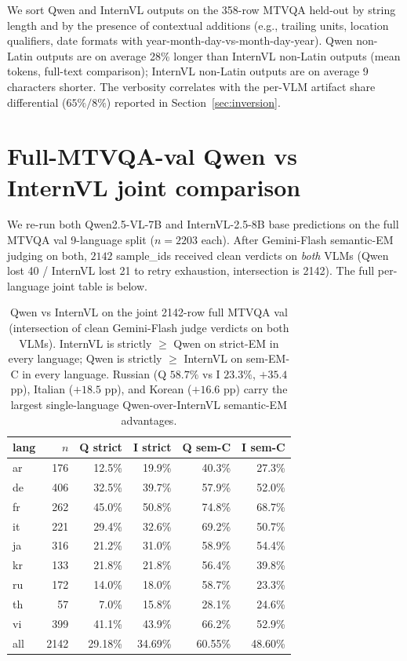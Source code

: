 We sort Qwen and InternVL outputs on the 358-row MTVQA held-out by string length and by the presence of contextual additions (e.g., trailing units, location qualifiers, date formats with year-month-day-vs-month-day-year). Qwen non-Latin outputs are on average 28\% longer than InternVL non-Latin outputs (mean tokens, full-text comparison); InternVL non-Latin outputs are on average 9 characters shorter. The verbosity correlates with the per-VLM artifact share differential ($65\% / 8\%$) reported in Section~\ref{sec:inversion}.

\section{Full-MTVQA-val Qwen vs InternVL joint comparison}
\label{app:per-language-fullval-joint}

We re-run both Qwen2.5-VL-7B and InternVL-2.5-8B base predictions on the full MTVQA val 9-language split ($n=2203$ each). After Gemini-Flash semantic-EM judging on both, $2142$ sample\_ids received clean verdicts on \emph{both} VLMs (Qwen lost 40 / InternVL lost 21 to retry exhaustion, intersection is 2142). The full per-language joint table is below.

\begin{table}[t]
\centering
\small
\begin{tabular}{lrrrrr}
\toprule
lang & $n$ & Q strict & I strict & Q sem-C & I sem-C \\
\midrule
ar & 176 & 12.5\% & 19.9\% & 40.3\% & 27.3\% \\
de & 406 & 32.5\% & 39.7\% & 57.9\% & 52.0\% \\
fr & 262 & 45.0\% & 50.8\% & 74.8\% & 68.7\% \\
it & 221 & 29.4\% & 32.6\% & 69.2\% & 50.7\% \\
ja & 316 & 21.2\% & 31.0\% & 58.9\% & 54.4\% \\
kr & 133 & 21.8\% & 21.8\% & 56.4\% & 39.8\% \\
ru & 172 & 14.0\% & 18.0\% & 58.7\% & 23.3\% \\
th &  57 &  7.0\% & 15.8\% & 28.1\% & 24.6\% \\
vi & 399 & 41.1\% & 43.9\% & 66.2\% & 52.9\% \\
\midrule
all & 2142 & 29.18\% & 34.69\% & 60.55\% & 48.60\% \\
\bottomrule
\end{tabular}
\caption{Qwen vs InternVL on the joint 2142-row full MTVQA val (intersection of clean Gemini-Flash judge verdicts on both VLMs). InternVL is strictly $\geq$ Qwen on strict-EM in every language; Qwen is strictly $\geq$ InternVL on sem-EM-C in every language. Russian (Q $58.7\%$ vs I $23.3\%$, $+35.4$ pp), Italian ($+18.5$ pp), and Korean ($+16.6$ pp) carry the largest single-language Qwen-over-InternVL semantic-EM advantages.}
\label{tab:perlang-fullval-joint}
\end{table}

